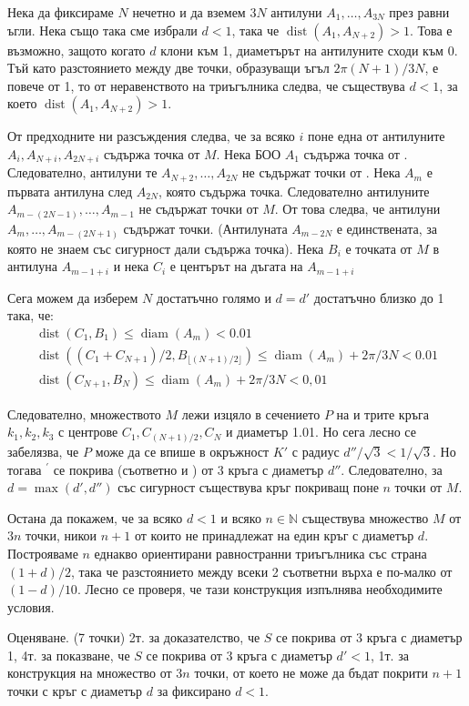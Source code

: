 Нека да фиксираме $N$ нечетно и да вземем $3N$ антилуни $A_1,\ldots,A_{3N}$ през равни ъгли. Нека също така сме избрали $d<1$, така че $\operatorname{dist}(A_1,A_{N+2})>1$. Това е възможно, защото когато $d$ клони към 1, диаметърът на антилуните сходи към 0. Тъй като разстоянието между две точки, образуващи ъгъл $2\pi(N+1)/3N$, е повече от 1, то от неравенството на триъгълника следва, че съществува $d<1$, за което $\operatorname{dist}(A_1,A_{N+2})>1$.

От предходните ни разсъждения следва, че за всяко $i$ поне една от антилуните $A_i,A_{N+i},A_{2N+i}$ съдържа точка от $M$. Нека БОО $A_1$ съдържа точка от . Следователно, антилуни те $A_{N+2},\ldots,A_{2N}$ не съдържат точки от . Нека $A_m$ е първата антилуна след $A_{2N}$, която съдържа точка. Следователно антилуните $A_{m-(2N-1)},\ldots,A_{m-1}$ не съдържат точки от $M$. От това следва, че антилуни $A_m,\ldots,A_{m-(2N+1)}$ съдържат точки. (Антилуната $A_{m-2N}$ е единствената, за която не знаем със сигурност дали съдържа точка). Нека $B_i$ е точката от $M$ в антилуна $A_{m-1+i}$ и нека $C_i$ е центърът на дъгата на $A_{m-1+i}$

Сега можем да изберем $N$ достатъчно голямо и $d=d'$ достатъчно близко до 1 така, че:
$$
\begin{gathered}
\operatorname{dist}(C_1,B_1)\leq\operatorname{diam}(A_m)<0.01\\
\operatorname{dist}((C_1+C_{N+1})/2,B_{\lfloor(N+1)/2\rfloor})\leq\operatorname{diam}(A_m)+2\pi/3N<0.01\\
\operatorname{dist}(C_{N+1},B_N)\leq\operatorname{diam}(A_m)+2\pi/3N<0,01
\end{gathered}
$$

Следователно, множеството $M$ лежи изцяло в сечението $P$ на и трите кръга $k_1,k_2,k_3$ с центрове $C_1,C_{(N+1)/2},C_N$ и диаметър 1.01. Но сега лесно се забелязва, че $P$ може да се впише в окръжност $K'$ с радиус $d''/\sqrt3<1/\sqrt3$. Но тогава ${}^{\prime}$ се покрива (съответно и ) от 3 кръга с диаметър $d''$. Следователно, за $d=\max(d',d'')$ със сигурност съществува кръг покриващ поне $n$ точки от $M$.

Остана да покажем, че за всяко $d<1$ и всяко $n\in\mathbb N$ съществува множество $M$ от $3n$ точки, никои $n+1$ от които не принадлежат на един кръг с диаметър $d$. Построяваме $n$ еднакво ориентирани равностранни триъгълника със страна $(1+d)/2$, така че разстоянието между всеки 2 съответни върха е по-малко от $(1-d)/10$. Лесно се проверя, че тази конструкция изпълнява необходимите условия.

Оценяване. (7 точки) 2т. за доказателство, че $S$ се покрива от 3 кръга с диаметър 1, 4т. за показване, че $S$ се покрива от 3 кръга с диаметър $d'<1$, 1т. за конструкция на множество от $3n$ точки, от което не може да бъдат покрити $n+1$ точки с кръг с диаметър $d$ за фиксирано $d<1$.
